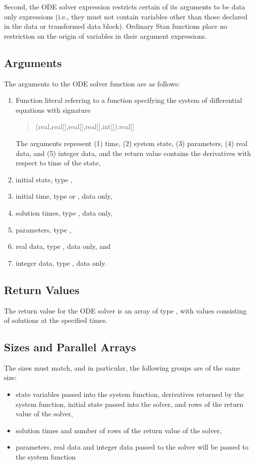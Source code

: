 Second, the ODE solver expression restricts certain of its arguments
to be data only expressions (i.e., they must not contain variables other
than those declared in the data or transformed data block).  Ordinary
Stan functions place no restriction on the origin of variables in
their argument expressions.

\subsection{Arguments}

The arguments to the ODE solver function  are as
follows:
%
\begin{enumerate}
\item Function literal referring to a function specifying the system
  of differential equations with signature
\begin{quote}
(real,real[],real[],real[],int[]):real[]
\end{quote}
The arguments represent (1) time, (2) system state, (3) parameters,
(4) real data, and (5) integer data, and the return value contains the
derivatives with respect to time of the state,
\item initial state, type ,
\item initial time, type  or , data only,
\item solution times, type , data only,
\item parameters, type ,
\item real data, type , data only, and
\item integer data, type , data only.
\end{enumerate}
%

\subsection{Return Values}

The return value for the ODE solver is an array of type
, with values consisting of solutions at the specified
times.

\subsection{Sizes and Parallel Arrays}

The sizes must match, and in particular, the following groups are of
the same size:
%
\begin{itemize}
\item state variables passed into the system function,
  derivatives returned by the system function, initial state passed
  into the solver, and rows of the return value of the solver,
\item solution times and number of rows of the return value of the solver,
\item parameters, real data and integer data passed to the solver will
  be passed to the system function
\end{itemize}
%

